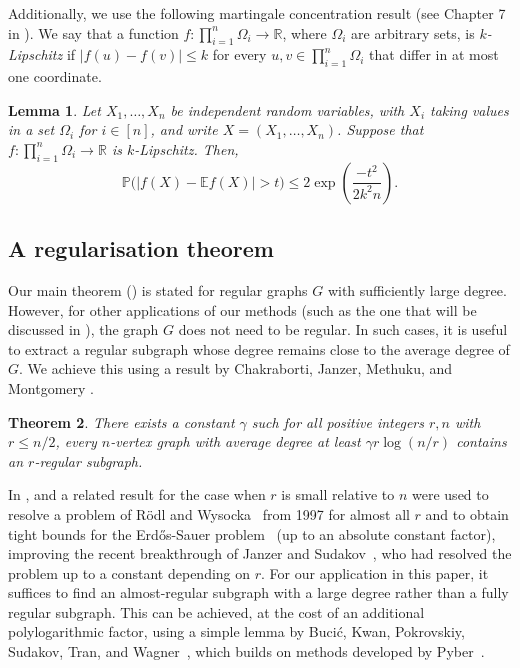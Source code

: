\documentclass[10pt]{article}
\theoremstyle{plain}
\newtheorem{theorem}{Theorem}
\numberwithin{theorem}{section}
\newtheorem{lemma}[theorem]{Lemma}
\theoremstyle{definition}
\theoremstyle{remark}
\newcommand{\Ex}{\mathbb{E}}
\newcommand{\bR}{\mathbb{R}}
\renewcommand{\Pr}{\mathbb{P}}
\theoremstyle{plain}
\begin{document}
Additionally, we use the following martingale concentration result (see Chapter 7 in \cite{alon2016probabilistic}).
We say that a function $f : \prod_{i = 1}^n	\Omega_i \to \bR$, where $\Omega_i$ are arbitrary sets, is \emph{$k$-Lipschitz} if $|f(u) - f(v)| \le k$ for every $u, v \in \prod_{i = 1}^n \Omega_i$ that differ in at most one coordinate.
\begin{lemma} 
	\label{lem:concentration}
	Let $X_1, \ldots, X_n$ be independent random variables, with $X_i$ taking values in a set $\Omega_i$ for $i \in [n]$, and write $X = (X_1, \ldots, X_n)$. 
	Suppose that $f : \prod_{i = 1}^n \Omega_i \to \bR$ is $k$-Lipschitz. Then,
	\begin{equation*}
		\Pr\big(|f(X) - \Ex f(X)| > t\big) \le 2 \exp \left(\frac{-t^2}{2k^2n}\right).
	\end{equation*}
\end{lemma}

\subsection{A regularisation theorem} \label{subsec:regularisation}

Our main theorem () is stated for regular graphs $G$ with sufficiently large degree. However, for other applications of our methods (such as the one that will be discussed in ), the graph
$G$ does not need to be regular. In such cases, it is useful to extract a regular subgraph whose degree remains close to the average degree of $G$. We achieve this using a result by Chakraborti, Janzer, Methuku, and Montgomery \cite{CJMMregular}. 

\begin{theorem} \label{thm:regular}
	There exists a constant $\gamma$ such for all positive integers $r,n$ with $r \le n/2$, every $n$-vertex graph with average degree at least $\gamma r\log(n/r)$ contains an $r$-regular subgraph.
\end{theorem}

In \cite{CJMMregular},  and a related result for the case when $r$ is small relative to $n$ were used to resolve a problem of R\"odl and Wysocka~\cite{rodl1997note} from 1997 for almost all $r$ and to obtain tight bounds for the Erd\H{o}s-Sauer problem~\cite{erdos1975some} (up to an absolute constant factor), improving the recent breakthrough of Janzer and Sudakov~\cite{janzer2023resolution}, who had resolved the problem up to a constant depending on $r$. For our application in this paper, it suffices to find an almost-regular subgraph with a large degree rather than a fully regular subgraph. This can be achieved, at the cost of an additional polylogarithmic factor, using a simple lemma by Buci\'c, Kwan, Pokrovskiy, Sudakov, Tran, and Wagner~\cite{bucic2020nearly}, which builds on methods developed by Pyber~\cite{pyber1985regular}.
\end{document}
